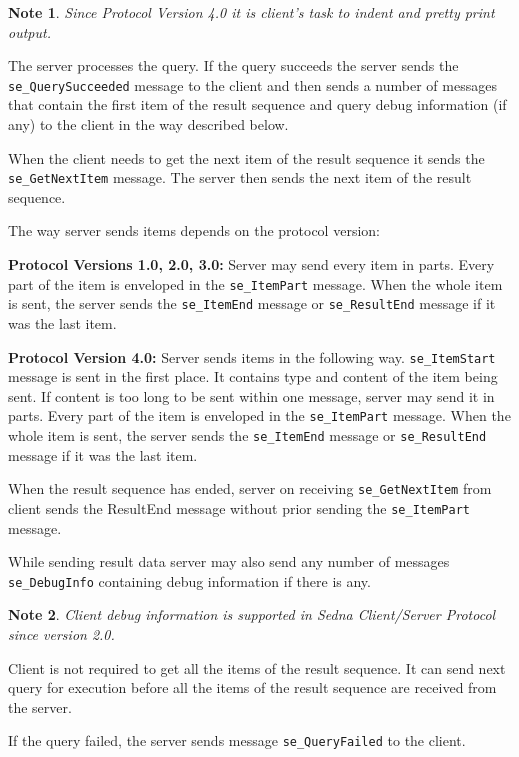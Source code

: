\documentclass[a4paper,12pt]{article}
\newtheorem{note}{Note}    %
\begin{document}
\begin{note}
Since Protocol Version 4.0 it is client's task to indent and pretty print output.
\end{note}

The server processes the query. If the query succeeds the server sends the \verb!se_QuerySucceeded! message to the client and then sends a number of messages that contain the first item of the result sequence and query debug information (if any) to the client in the way described below.

When the client needs to get the next item of the result sequence it sends the \verb!se_GetNextItem! message. The server then sends the next item of the result sequence.

The way server sends items depends on the protocol version:

\textbf{Protocol Versions 1.0, 2.0, 3.0:} Server may send every item in parts. Every part of the item is enveloped in the \verb!se_ItemPart! message. When the whole item is sent, the server sends the \verb!se_ItemEnd! message or \verb!se_ResultEnd! message if it was the last item.

\textbf{Protocol Version 4.0:} Server sends items in the following way. \verb!se_ItemStart! message is sent in the first place. It contains type and content of the item being sent. If content is too long to be sent within one message, server may send it in parts. Every part of the item is enveloped in the \verb!se_ItemPart! message. When the whole item is sent, the server sends the \verb!se_ItemEnd! message or \verb!se_ResultEnd! message if it was the last item.

When the result sequence has ended, server on receiving \verb!se_GetNextItem! from client sends the ResultEnd message without prior sending the \verb!se_ItemPart! message.

While sending result data server may also send any number of messages \verb!se_DebugInfo! containing debug information if there is any.

\begin{note}
Client debug information is supported in Sedna Client/Server Protocol since version 2.0.
\end{note}

Client is not required to get all the items of the result sequence. It can send next query for execution before all the items of the result sequence are received from the server.

If the query failed, the server sends message \verb!se_QueryFailed! to the client.
\end{document}
